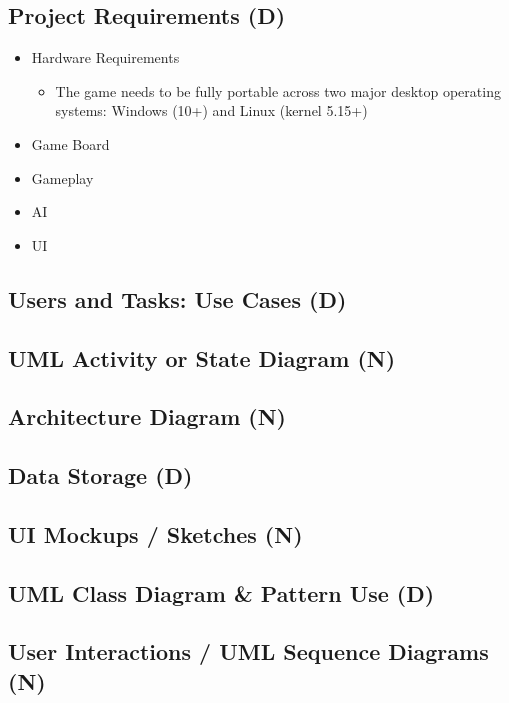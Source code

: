 \documentclass[11pt]{amsart}
\begin{document}
\subsection*{Project Requirements (D)} \phantom{}
\begin{itemize}
    \item Hardware Requirements
    \begin{itemize}
        \item The game needs to be fully portable across two major desktop operating systems: Windows (10+) and Linux (kernel 5.15+)
    \end{itemize}
    \item Game Board
    \item Gameplay
    \item AI
    \item UI
\end{itemize}



\subsection*{Users and Tasks: Use Cases (D)} \phantom{}
\subsection*{UML Activity or State Diagram (N)} \phantom{}
\subsection*{Architecture Diagram (N)} \phantom{}
\subsection*{Data Storage (D)} \phantom{}
\subsection*{UI Mockups / Sketches (N)} \phantom{}
\subsection*{UML Class Diagram \& Pattern Use (D)} \phantom{}
\subsection*{User Interactions / UML Sequence Diagrams (N)} \phantom{}
\end{document}
